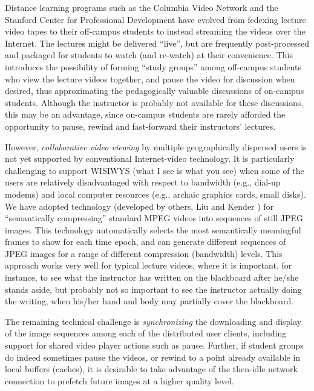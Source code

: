 \documentclass{sig-alternate}
\begin{document}


Distance learning programs such as the Columbia Video Network and the
Stanford Center for Professional Development have evolved from
fedexing lecture video tapes to their off-campus students to instead
streaming the videos over the Internet.  The lectures might be
delivered ``live'', but are frequently post-processed and packaged for
students to watch (and re-watch) at their convenience.  This
introduces the possibility of forming ``study groups'' among
off-campus students who view the lecture videos together, and pause
the video for discussion when desired, thus approximating the
pedagogically valuable discussions of on-campus students.  Although
the instructor is probably not available for these discussions, this
may be an advantage, since on-campus students are rarely afforded the
opportunity to pause, rewind and fast-forward their instructors'
lectures.


However, {\em collaborative video viewing} by multiple geographically
dispersed users is not yet supported by conventional Internet-video
technology.  It is particularly challenging to support WISIWYS (what I
see is what you see) when some of the users are relatively
disadvantaged with respect to bandwidth (e.g., dial-up modems) and
local computer resources (e.g., archaic graphics cards, small disks).
We have adopted technology (developed by others, Liu and Kender
\cite{TIECHENG}) for ``semantically compressing'' standard MPEG videos
into sequences of still JPEG images.  This technology automatically
selects the most semantically meaningful frames to show for each time
epoch, and can generate different sequences of JPEG images for a range
of different compression (bandwidth) levels.  This approach works very
well for typical lecture videos, where it is important, for instance,
to see what the instructor has written on the blackboard after he/she
stands aside, but probably not so important to see the instructor
actually doing the writing, when his/her hand and body may partially
cover the blackboard.

The remaining technical challenge is {\em synchronizing} the
downloading and display of the image sequences among each of the
distributed user clients, including support for shared video player
actions such as pause.  Further, if student groups do indeed sometimes
pause the videos, or rewind to a point already available in local
buffers (caches), it is desirable to take advantage of the then-idle
network connection to prefetch future images at a higher quality
level.
\end{document}
